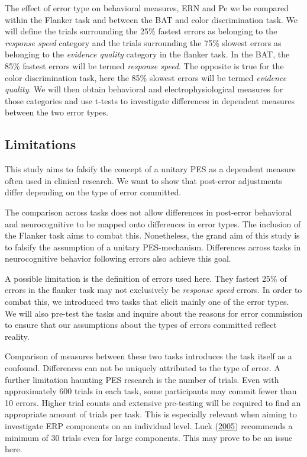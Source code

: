 \documentclass[
  man,floatsintext]{apa7}
\begin{document}
The effect of error type on behavioral measures, ERN and Pe we be compared within the Flanker task and between the BAT and color discrimination task. We will define the trials surrounding the 25\% fastest errors as belonging to the \emph{response speed} category and the trials surrounding the 75\% slowest errors as belonging to the \emph{evidence quality} category in the flanker task. In the BAT, the 85\% fastest errors will be termed \emph{response speed}. The opposite is true for the color discrimination task, here the 85\% slowest errors will be termed \emph{evidence quality}. We will then obtain behavioral and electrophysiological measures for those categories and use t-tests to investigate differences in dependent measures between the two error types.

\hypertarget{limitations}{%
\subsection{Limitations}\label{limitations}}

This study aims to falsify the concept of a unitary PES as a dependent measure often used in clinical research. We want to show that post-error adjustments differ depending on the type of error committed.

The comparison across tasks does not allow differences in post-error behavioral and neurocognitive to be mapped onto differences in error types. The inclusion of the Flanker task aims to combat this. Nonetheless, the grand aim of this study is to falsify the assumption of a unitary PES-mechanism. Differences across tasks in neurocognitive behavior following errors also achieve this goal.

A possible limitation is the definition of errors used here. They fastest 25\% of errors in the flanker task may not exclusively be \emph{response speed} errors. In order to combat this, we introduced two tasks that elicit mainly one of the error types. We will also pre-test the tasks and inquire about the reasons for error commission to ensure that our assumptions about the types of errors committed reflect reality.

Comparison of measures between these two tasks introduces the task itself as a confound. Differences can not be uniquely attributed to the type of error. A further limitation haunting PES research is the number of trials. Even with approximately 600 trials in each task, some participants may commit fewer than 10 errors. Higher trial counts and extensive pre-testing will be required to find an appropriate amount of trials per task. This is especially relevant when aiming to investigate ERP components on an individual level. Luck (\protect\hyperlink{ref-luck2005ten}{2005}) recommends a minimum of 30 trials even for large components. This may prove to be an issue here.
\end{document}
